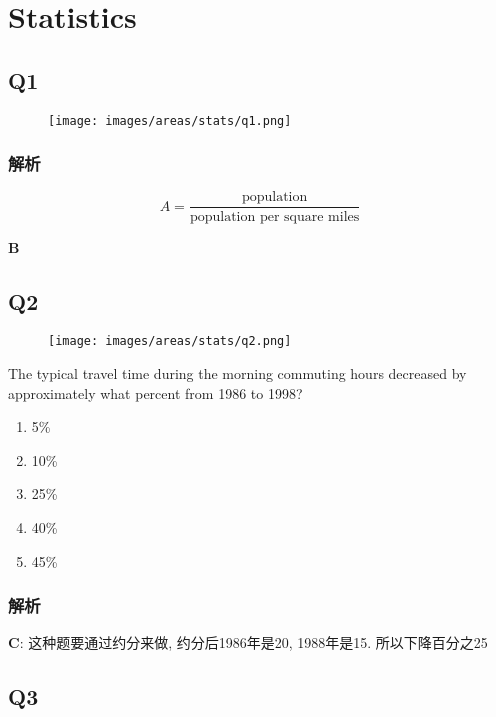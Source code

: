 \chapter{Statistics}

\section{Q1}

  \begin{figure}[H]
    \centering
    \texttt{[image: images/areas/stats/q1.png]}
  \end{figure}

  \subsection{解析}

    \begin{equation*}
      A = \frac{\text{population}}{\text{population per square miles}}
    \end{equation*}

    \textbf{B}

\section{Q2}

  \begin{figure}[H]
    \centering
    \texttt{[image: images/areas/stats/q2.png]}
  \end{figure}

  The typical travel time during the morning commuting hours decreased by
  approximately what percent from 1986 to 1998?

  \begin{enumerate}
    \item 5\%
    \item 10\%
    \item 25\%
    \item 40\%
    \item 45\%
  \end{enumerate}

  \subsection{解析}

    \textbf{C}: 这种题要通过约分来做, 约分后1986年是20, 1988年是15. 所以下降百分之25

\section{Q3}

